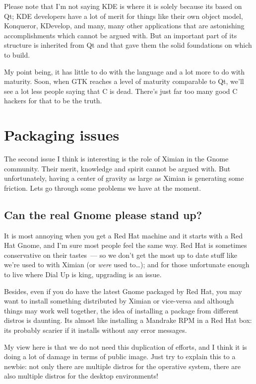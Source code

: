 \documentclass{book}
\begin{document}
Please note that I'm not saying KDE is where it is solely because its
based on Qt; KDE developers have a lot of merit for things like their
own object model, Konqueror, KDevelop, and many, many other
applications that are astonishing accomplishments which cannot be
argued with. But an important part of its structure is inherited from
Qt and that gave them the solid foundations on which to build.

My point being, it has little to do with the language and a lot more
to do with maturity. Soon, when GTK reaches a level of maturity
comparable to Qt, we'll see a lot less people saying that C is
dead. There's just far too many good C hackers for that to be the
truth.

\section{Packaging issues}

The second issue I think is interesting is the role of Ximian in the
Gnome community. Their merit, knowledge and spirit cannot be argued
with. But unfortunately, having a center of gravity as large as Ximian
is generating some friction. Lets go through some problems we have at
the moment.

\subsection{Can the real Gnome please stand up?}

It is most annoying when you get a Red Hat machine and it starts with
a Red Hat Gnome, and I'm sure most people feel the same way. Red Hat
is sometimes conservative on their tastes~--- so we don't get the most
up to date stuff like we're used to with Ximian (or \emph{were} used
to\ldots); and for those unfortunate enough to live where Dial Up is
king, upgrading is an issue.

Besides, even if you do have the latest Gnome packaged by Red Hat, you
may want to install something distributed by Ximian or vice-versa and
although things may work well together, the idea of installing a
package from different distros is daunting. Its almost like installing
a Mandrake RPM in a Red Hat box: its probably scarier if it installs
without any error messages.

My view here is that we do not need this duplication of efforts, and I
think it is doing a lot of damage in terms of public image. Just try
to explain this to a newbie: not only there are multiple distros for
the operative system, there are also multiple distros for the desktop
environments!
\end{document}
